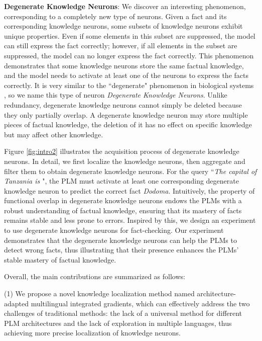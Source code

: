 \documentclass[]{article}
\begin{document}
\textbf{Degenerate Knowledge Neurons}: We discover an interesting phenomenon, corresponding to a completely new type of neurons. Given a fact and its corresponding knowledge neurons, some subsets of knowledge neurons exhibit unique properties. Even if some elements in this subset are suppressed, the model can still express the fact correctly; however, if all elements in the subset are suppressed, the model can no longer express the fact correctly. This phenomenon demonstrates that some knowledge neurons store the same factual knowledge, and the model needs to activate at least one of the neurons to express the facts correctly. It is very similar to the ``degenerate" phenomenon in biological systems \cite{degenerate_biological,mason2015degeneracy}, so we name this type of neuron \textit{Degenerate Knowledge Neurons}.
Unlike redundancy, degenerate knowledge neurons cannot simply be deleted because they only partially overlap. A degenerate knowledge neuron may store multiple pieces of factual knowledge, the deletion of it has no effect on specific knowledge but may affect other knowledge.

Figure \ref{fig:intro2} illustrates the acquisition process of degenerate knowledge neurons. In detail, we first localize the knowledge neurons, then aggregate and filter them to obtain degenerate knowledge neurons. For the query ``\textit{The capital of Tanzania is \underline{\hspace{0.4cm}}}", the PLM must activate at least one corresponding degenerate knowledge neuron to predict the correct fact \textit{Dodoma}.
Intuitively, the property of functional overlap in degenerate knowledge neurons endows the PLMs with a robust understanding of factual knowledge, ensuring that its mastery of facts remains stable and less prone to errors.
Inspired by this, we design an experiment to use degenerate knowledge neurons for fact-checking. Our experiment demonstrates that the degenerate knowledge neurons can help the PLMs to detect wrong facts, thus illustrating that their presence enhances the PLMs' stable mastery of factual knowledge.


Overall, the main contributions are summarized as follows:

(1) We propose a novel knowledge localization method named architecture-adapted multilingual integrated gradients, which can effectively address the two challenges of traditional methods: the lack of a universal method for different PLM architectures and the lack of exploration in multiple languages, thus achieving more precise localization of knowledge neurons.
\end{document}
